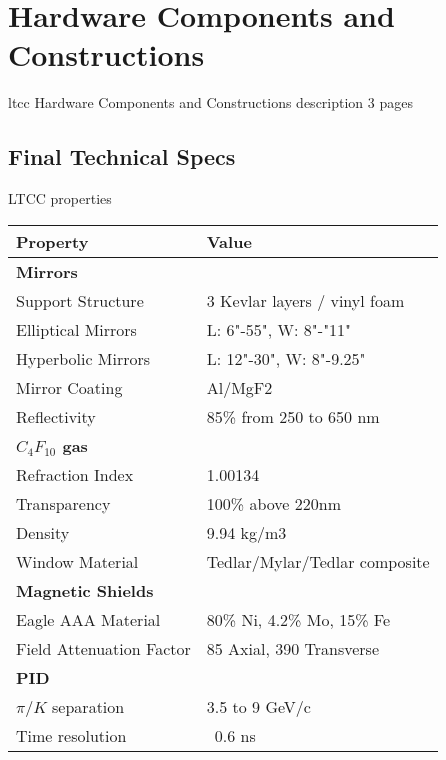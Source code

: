 \section{Hardware Components and Constructions}

ltcc Hardware Components and Constructions description 3 pages

\subsection{Final Technical Specs}


\begin{center}
	LTCC properties\\
	\begin{tabular}{| l | l |}
		\hline \hline
		Property                 & Value \\
		\hline
		{\bf Mirrors}            &                                      \\
		Support Structure        & 3 Kevlar layers / vinyl foam         \\
		Elliptical Mirrors       & L: 6"-55", W: 8"-"11"                \\
		Hyperbolic Mirrors       & L: 12"-30", W: 8"-9.25"              \\
		Mirror Coating           & Al/MgF2                              \\
		Reflectivity             & 85\% from 250 to 650 nm              \\
		{\bf $C_4F_{10}$ gas}    &                                      \\
		Refraction Index         & 1.00134                              \\
		Transparency             & 100\% above 220nm                    \\
		Density                  & 9.94 kg/m3                           \\
		Window Material          & Tedlar/Mylar/Tedlar composite        \\
		{\bf Magnetic Shields}   &                                      \\
		Eagle AAA Material       & 80\% Ni, 4.2\% Mo, 15\% Fe           \\
		Field Attenuation Factor &  85 Axial, 390 Transverse            \\
		{\bf PID}                &                                      \\
		$\pi/K$ separation       &  3.5 to 9 GeV/c                      \\
		Time resolution          &  ~0.6 ns                             \\
		\hline \hline
	\end{tabular}
\end{center}

